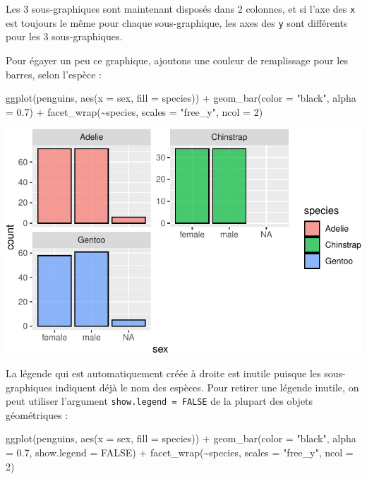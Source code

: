 \documentclass[
  a4paper,
  DIV=11,
  numbers=noendperiod,
  oneside]{scrreprt}
\newenvironment{Shaded}{}{}
\newcommand{\AttributeTok}[1]{\textcolor[rgb]{0.84,0.23,0.29}{#1}}
\newcommand{\ConstantTok}[1]{\textcolor[rgb]{0.00,0.36,0.77}{#1}}
\newcommand{\DecValTok}[1]{\textcolor[rgb]{0.00,0.36,0.77}{#1}}
\newcommand{\FloatTok}[1]{\textcolor[rgb]{0.00,0.36,0.77}{#1}}
\newcommand{\FunctionTok}[1]{\textcolor[rgb]{0.44,0.26,0.76}{#1}}
\newcommand{\NormalTok}[1]{\textcolor[rgb]{0.14,0.16,0.18}{#1}}
\newcommand{\SpecialCharTok}[1]{\textcolor[rgb]{0.00,0.36,0.77}{#1}}
\newcommand{\StringTok}[1]{\textcolor[rgb]{0.01,0.18,0.38}{#1}}
\begin{document}
Les 3 sous-graphiques sont maintenant disposés dans 2 colonnes, et si
l'axe des \texttt{x} est toujours le même pour chaque sous-graphique,
les axes des \texttt{y} sont différents pour les 3 sous-graphiques.

Pour égayer un peu ce graphique, ajoutons une couleur de remplissage
pour les barres, selon l'espèce :

\begin{Shaded}
\begin{Highlighting}[]
\FunctionTok{ggplot}\NormalTok{(penguins, }\FunctionTok{aes}\NormalTok{(}\AttributeTok{x =}\NormalTok{ sex, }\AttributeTok{fill =}\NormalTok{ species)) }\SpecialCharTok{+}
  \FunctionTok{geom\_bar}\NormalTok{(}\AttributeTok{color =} \StringTok{"black"}\NormalTok{, }\AttributeTok{alpha =} \FloatTok{0.7}\NormalTok{) }\SpecialCharTok{+}
  \FunctionTok{facet\_wrap}\NormalTok{(}\SpecialCharTok{\textasciitilde{}}\NormalTok{species, }\AttributeTok{scales =} \StringTok{"free\_y"}\NormalTok{, }\AttributeTok{ncol =} \DecValTok{2}\NormalTok{)}
\end{Highlighting}
\end{Shaded}

\includegraphics{03-visualization_files/figure-pdf/unnamed-chunk-63-1.pdf}

La légende qui est automatiquement créée à droite est inutile puisque
les sous-graphiques indiquent déjà le nom des espèces. Pour retirer une
légende inutile, on peut utiliser l'argument
\texttt{show.legend\ =\ FALSE} de la plupart des objets géométriques :

\begin{Shaded}
\begin{Highlighting}[]
\FunctionTok{ggplot}\NormalTok{(penguins, }\FunctionTok{aes}\NormalTok{(}\AttributeTok{x =}\NormalTok{ sex, }\AttributeTok{fill =}\NormalTok{ species)) }\SpecialCharTok{+}
  \FunctionTok{geom\_bar}\NormalTok{(}\AttributeTok{color =} \StringTok{"black"}\NormalTok{, }\AttributeTok{alpha =} \FloatTok{0.7}\NormalTok{, }\AttributeTok{show.legend =} \ConstantTok{FALSE}\NormalTok{) }\SpecialCharTok{+}
  \FunctionTok{facet\_wrap}\NormalTok{(}\SpecialCharTok{\textasciitilde{}}\NormalTok{species, }\AttributeTok{scales =} \StringTok{"free\_y"}\NormalTok{, }\AttributeTok{ncol =} \DecValTok{2}\NormalTok{)}
\end{Highlighting}
\end{Shaded}
\end{document}
